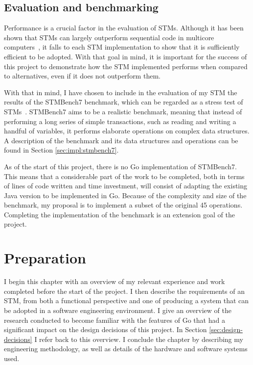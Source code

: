 \documentclass[12pt,a4paper,oneside,openright]{report}
\begin{document}
\section{Evaluation and benchmarking}
\label{sec:eval-benchm}

Performance is a crucial factor in the evaluation of STMs. Although it
has been shown that STMs can largely outperform sequential code in
multicore computers~\cite{MoreThanToy}, it falls to each STM
implementation to show that it is sufficiently efficient to be
adopted. With that goal in mind, it is important for the success of
this project to demonstrate how the STM implemented performs when
compared to alternatives, even if it does not outperform them.

With that in mind, I have chosen to include in the evaluation of my
STM the results of the STMBench7 benchmark, which can be regarded as a
stress test of STMs~\cite{STMBench7}. STMBench7 aims to be a realistic
benchmark, meaning that instead of performing a long series of simple
transactions, such as reading and writing a handful of variables, it
performs elaborate operations on complex data structures. A
description of the benchmark and its data structures and operations
can be found in Section \ref{sec:impl:stmbench7}.

As of the start of this project, there is no Go implementation of
STMBench7. This means that a considerable part of the work to be
completed, both in terms of lines of code written and time investment,
will consist of adapting the existing Java version to be implemented
in Go. Because of the complexity and size of the benchmark, my
proposal is to implement a subset of the original 45
operations. Completing the implementation of the benchmark is an
extension goal of the project.


\chapter{Preparation}

I begin this chapter with an overview of my relevant experience and
work completed before the start of the project. I then describe the
requirements of an STM, from both a functional perspective and one of
producing a system that can be adopted in a software engineering
environment. I give an overview of the research conducted to become
familiar with the features of Go that had a significant impact on the
design decisions of this project. In Section
\ref{sec:design-decisions} I refer back to this overview. I conclude
the chapter by describing my engineering methodology, as well as
details of the hardware and software systems used.
\end{document}
